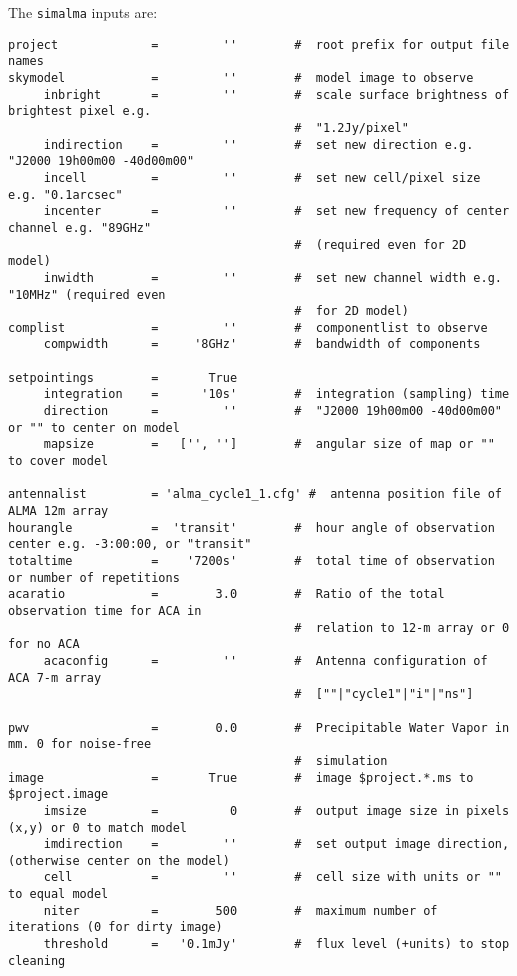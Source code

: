 
The {\tt simalma} inputs are:
\small
\begin{verbatim}
project             =         ''        #  root prefix for output file names
skymodel            =         ''        #  model image to observe
     inbright       =         ''        #  scale surface brightness of brightest pixel e.g.
                                        #  "1.2Jy/pixel"
     indirection    =         ''        #  set new direction e.g. "J2000 19h00m00 -40d00m00"
     incell         =         ''        #  set new cell/pixel size e.g. "0.1arcsec"
     incenter       =         ''        #  set new frequency of center channel e.g. "89GHz"
                                        #  (required even for 2D model)
     inwidth        =         ''        #  set new channel width e.g. "10MHz" (required even
                                        #  for 2D model)
complist            =         ''        #  componentlist to observe
     compwidth      =     '8GHz'        #  bandwidth of components

setpointings        =       True        
     integration    =      '10s'        #  integration (sampling) time
     direction      =         ''        #  "J2000 19h00m00 -40d00m00" or "" to center on model
     mapsize        =   ['', '']        #  angular size of map or "" to cover model

antennalist         = 'alma_cycle1_1.cfg' #  antenna position file of ALMA 12m array
hourangle           =  'transit'        #  hour angle of observation center e.g. -3:00:00, or "transit"
totaltime           =    '7200s'        #  total time of observation or number of repetitions
acaratio            =        3.0        #  Ratio of the total observation time for ACA in
                                        #  relation to 12-m array or 0 for no ACA
     acaconfig      =         ''        #  Antenna configuration of ACA 7-m array
                                        #  [""|"cycle1"|"i"|"ns"]

pwv                 =        0.0        #  Precipitable Water Vapor in mm. 0 for noise-free
                                        #  simulation
image               =       True        #  image $project.*.ms to $project.image
     imsize         =          0        #  output image size in pixels (x,y) or 0 to match model
     imdirection    =         ''        #  set output image direction, (otherwise center on the model)
     cell           =         ''        #  cell size with units or "" to equal model
     niter          =        500        #  maximum number of iterations (0 for dirty image)
     threshold      =   '0.1mJy'        #  flux level (+units) to stop cleaning


\end{verbatim}
